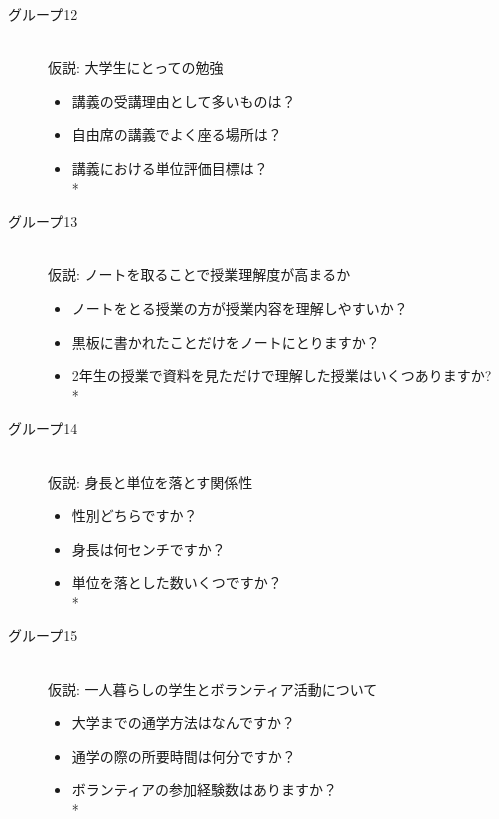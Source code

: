 \begin{description}
 \item[グループ12]\mbox{}\\
 仮説: 大学生にとっての勉強
	    \begin{itemize}
   	\item 講義の受講理由として多いものは？
   	\item 自由席の講義でよく座る場所は？
   	\item 講義における単位評価目標は？   \vspace{0.1in} \\*
	\end{itemize}

 \item[グループ13]\mbox{}\\
 仮説: ノートを取ることで授業理解度が高まるか
	    \begin{itemize}
   	\item ノートをとる授業の方が授業内容を理解しやすいか？
   	\item 黒板に書かれたことだけをノートにとりますか？
   	\item 2年生の授業で資料を見ただけで理解した授業はいくつありますか?   \vspace{0.1in} \\*
	\end{itemize}

 \item[グループ14]\mbox{}\\
 仮説: 身長と単位を落とす関係性
	    \begin{itemize}
   	\item 性別どちらですか？
   	\item 身長は何センチですか？
   	\item 単位を落とした数いくつですか？   \vspace{0.1in} \\*
	\end{itemize}

 \item[グループ15]\mbox{}\\
 仮説: 一人暮らしの学生とボランティア活動について
	    \begin{itemize}
   	\item 大学までの通学方法はなんですか？
   	\item 通学の際の所要時間は何分ですか？
   	\item ボランティアの参加経験数はありますか？   \vspace{0.1in} \\*
	\end{itemize}
	
\end{description}


